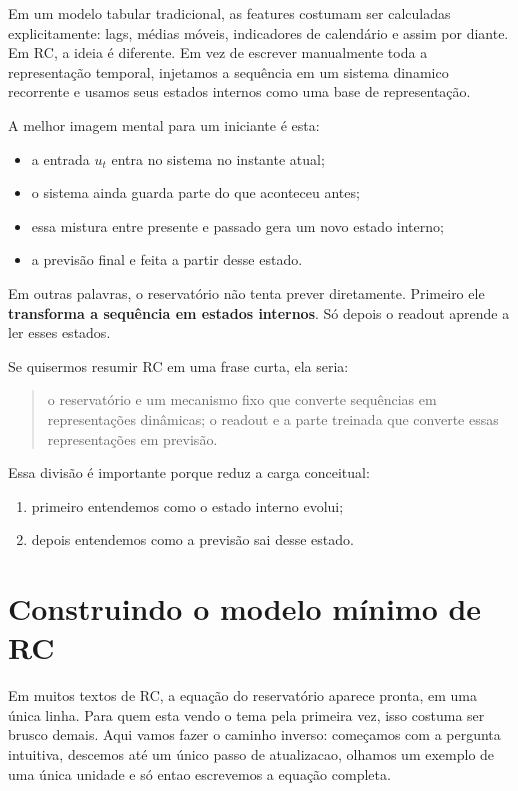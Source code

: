 \documentclass[12pt]{article}
\providecommand{\tightlist}{%
              \setlength{\itemsep}{0pt}\setlength{\parskip}{0pt}}
\begin{document}
Em um modelo tabular tradicional, as features costumam ser calculadas explicitamente: lags, médias móveis, indicadores de calendário e assim por diante. Em RC, a ideia é diferente. Em vez de escrever manualmente toda a representação temporal, injetamos a sequência em um sistema dinamico recorrente e usamos seus estados internos como uma base de representação.

A melhor imagem mental para um iniciante é esta:

\begin{itemize}
\tightlist
\item
  a entrada \(u_t\) entra no sistema no instante atual;
\item
  o sistema ainda guarda parte do que aconteceu antes;
\item
  essa mistura entre presente e passado gera um novo estado interno;
\item
  a previsão final e feita a partir desse estado.
\end{itemize}

Em outras palavras, o reservatório não tenta prever diretamente. Primeiro ele \textbf{transforma a sequência em estados internos}. Só depois o readout aprende a ler esses estados.

Se quisermos resumir RC em uma frase curta, ela seria:

\begin{quote}
o reservatório e um mecanismo fixo que converte sequências em representações dinâmicas; o readout e a parte treinada que converte essas representações em previsão.
\end{quote}

Essa divisão é importante porque reduz a carga conceitual:

\begin{enumerate}
\def\labelenumi{\arabic{enumi}.}
\tightlist
\item
  primeiro entendemos como o estado interno evolui;
\item
  depois entendemos como a previsão sai desse estado.
\end{enumerate}

\section{Construindo o modelo mínimo de RC}\label{3-construindo-o-modelo-muxednimo-de-rc}

Em muitos textos de RC, a equação do reservatório aparece pronta, em uma única linha. Para quem esta vendo o tema pela primeira vez, isso costuma ser brusco demais. Aqui vamos fazer o caminho inverso: começamos com a pergunta intuitiva, descemos até um único passo de atualizacao, olhamos um exemplo de uma única unidade e só entao escrevemos a equação completa.
\end{document}
